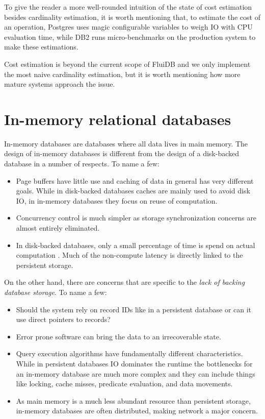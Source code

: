 To give the reader a more well-rounded intuition of the state of cost
estimation besides cardinality estimation, it is worth mentioning that,
to estimate the cost of an operation, Postgres uses magic configurable
variables to weigh IO with CPU evaluation time, while DB2 runs
micro-benchmarks on the production system to make these estimations.

Cost estimation is beyond the current scope of FluiDB and we only
implement the most naive cardinality estimation, but it is worth
mentioning how more mature systems approach the issue.

\section{In-memory relational databases}

In-memory databases are databases where all data lives in main
memory. The design of in-memory databases is different from the design
of a disk-backed database in a number of respects. To name a few:

\begin{itemize}
\item Page buffers have little use and caching of data in general has very
different goals. While in disk-backed databases caches are mainly used to
avoid disk IO, in in-memory databases they focus on reuse of computation.
\item Concurrency control is much simpler as storage synchronization
concerns are almost entirely eliminated.
\item In disk-backed databases, only a small percentage of time is spend on
actual computation \cite{harizopoulosOLTPLookingGlass2018}. Much of
the non-compute latency is directly linked to the persistent
storage.
\end{itemize}

On the other hand, there are concerns that are specific to the
\emph{lack of backing database storage}. To name a few:

\begin{itemize}
\item Should the system rely on record IDs like in a persistent database
or can it use direct pointers to records?
\item Error prone software can bring the data to an irrecoverable state.
\item Query execution algorithms have fundamentally different
characteristics. While in persistent databases IO dominates the
runtime the bottlenecks for an in-memory database are much more
complex and they can include things like locking, cache misses,
predicate evaluation, and data movements.
\item As main memory is a much less abundant resource than persistent
storage, in-memory databases are often distributed, making network a
major concern.
\end{itemize}

